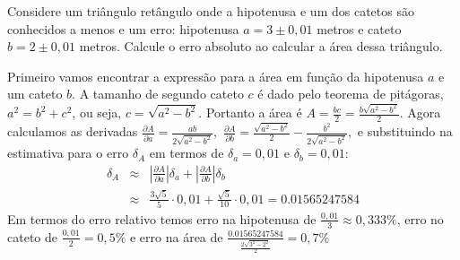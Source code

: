 \begin{ex}
Considere um triângulo retângulo onde a hipotenusa e um dos catetos são conhecidos a menos e um erro: hipotenusa $a=3\pm 0,01$ metros e cateto $b=2\pm 0,01$ metros. Calcule o erro absoluto ao calcular a área dessa triângulo.

Primeiro vamos encontrar a expressão para a área em função da hipotenusa $a$ e um cateto $b$. A tamanho de segundo cateto $c$ é dado pelo teorema de pitágoras, $a^2=b^2+c^2$, ou seja, $c=\sqrt{a^2-b^2}$. Portanto a área é $
A=\frac{bc}{2}=\frac{b\sqrt{a^2-b^2}}{2}.
$
Agora calculamos as derivadas
$
\frac{\partial A}{\partial a}=\frac{ab}{2\sqrt{a^2-b^2}},
$
$
\frac{\partial A}{\partial b}=\frac{\sqrt{a^2-b^2}}{2}-\frac{b^2}{2\sqrt{a^2-b^2}},
$
e substituindo na estimativa para o erro $\delta_A$ em termos de $\delta_a=0,01$ e $\delta_b=0,01$:
\begin{eqnarray*}
\delta_A&\approx & \left|\frac{\partial A}{\partial a}\right|\delta_a+\left|\frac{\partial A}{\partial b}\right|\delta_b\\
&\approx &\frac{3\sqrt{5}}{5}\cdot 0,01+\frac{\sqrt{5}}{10}\cdot 0,01=0.01565247584
\end{eqnarray*}
Em termos do erro relativo temos erro na hipotenusa de $\frac{0,01}{3}\approx 0,333\%$, erro no cateto de $\frac{0,01}{2}= 0,5\%$ e erro na área de
$
\frac{0.01565247584}{\frac{2\sqrt{3^2-2^2}}{2}}=0,7\%
$
\end{ex}

